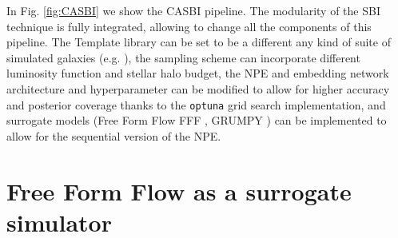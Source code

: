 In Fig. \ref{fig:CASBI} we show the CASBI pipeline. The modularity of the SBI technique is fully integrated, allowing to change all the components of this pipeline. The Template library can be set to be a different any kind of suite of simulated galaxies (e.g. \cite{pillepichMilkyWayAndromeda2023}), the sampling scheme can incorporate different luminosity function and stellar halo budget, the NPE and embedding network architecture and hyperparameter can be modified to allow for higher accuracy and posterior coverage thanks to the \texttt{optuna} grid search implementation, and surrogate models (Free Form Flow FFF \cite{draxlerFreeformFlowsMake2024}, GRUMPY \cite{kravtsovGRUMPYSimpleFramework2022}) can be implemented to allow for the sequential version of the NPE.      


\section{Free Form Flow as a surrogate simulator}


